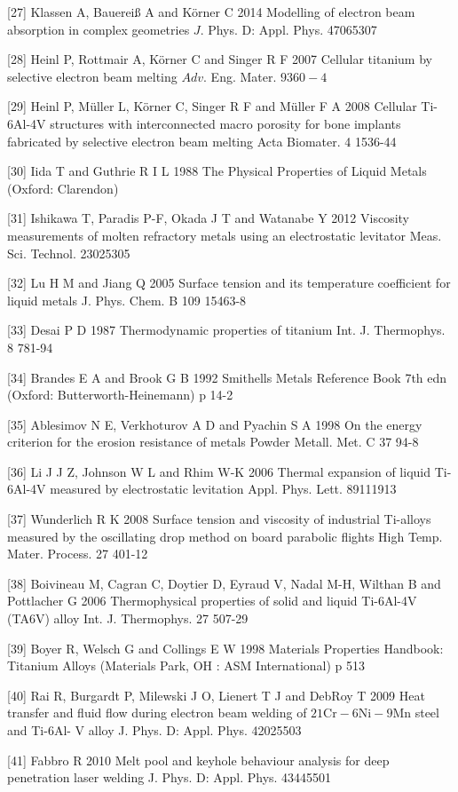 \documentclass[10pt]{article}
\begin{document}
[27] Klassen A, Bauereiß A and Körner C 2014 Modelling of electron beam absorption in complex geometries $J$. Phys. D: Appl. Phys. 47065307

[28] Heinl P, Rottmair A, Körner C and Singer R F 2007 Cellular titanium by selective electron beam melting $A d v$. Eng. Mater. $9360-4$

[29] Heinl P, Müller L, Körner C, Singer R F and Müller F A 2008 Cellular Ti-6Al-4V structures with interconnected macro porosity for bone implants fabricated by selective electron beam melting Acta Biomater. 4 1536-44

[30] Iida T and Guthrie R I L 1988 The Physical Properties of Liquid Metals (Oxford: Clarendon)

[31] Ishikawa T, Paradis P-F, Okada J T and Watanabe Y 2012 Viscosity measurements of molten refractory metals using an electrostatic levitator Meas. Sci. Technol. 23025305

[32] Lu H M and Jiang Q 2005 Surface tension and its temperature coefficient for liquid metals J. Phys. Chem. B 109 15463-8

[33] Desai P D 1987 Thermodynamic properties of titanium Int. J. Thermophys. 8 781-94

[34] Brandes E A and Brook G B 1992 Smithells Metals Reference Book 7th edn (Oxford: Butterworth-Heinemann) p 14-2

[35] Ablesimov N E, Verkhoturov A D and Pyachin S A 1998 On the energy criterion for the erosion resistance of metals Powder Metall. Met. C 37 94-8

[36] Li J J Z, Johnson W L and Rhim W-K 2006 Thermal expansion of liquid Ti-6Al-4V measured by electrostatic levitation Appl. Phys. Lett. 89111913

[37] Wunderlich R K 2008 Surface tension and viscosity of industrial Ti-alloys measured by the oscillating drop method on board parabolic flights High Temp. Mater. Process. 27 401-12

[38] Boivineau M, Cagran C, Doytier D, Eyraud V, Nadal M-H, Wilthan B and Pottlacher G 2006 Thermophysical properties of solid and liquid Ti-6Al-4V (TA6V) alloy Int. J. Thermophys. 27 507-29

[39] Boyer R, Welsch G and Collings E W 1998 Materials Properties Handbook: Titanium Alloys (Materials Park, $\mathrm{OH}$ : ASM International) p 513

[40] Rai R, Burgardt P, Milewski J O, Lienert T J and DebRoy T 2009 Heat transfer and fluid flow during electron beam welding of $21 \mathrm{Cr}-6 \mathrm{Ni}-9 \mathrm{Mn}$ steel and Ti-6Al- $\mathrm{V}$ alloy J. Phys. D: Appl. Phys. 42025503

[41] Fabbro R 2010 Melt pool and keyhole behaviour analysis for deep penetration laser welding J. Phys. D: Appl. Phys. 43445501
\end{document}
